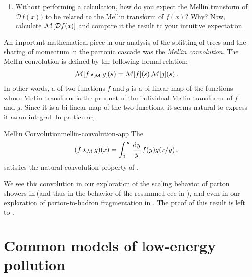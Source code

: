 \begin{subappendices}
\begin{exercise}
\begin{enumerate}[label=\roman*)]
        \item
            Without performing a calculation, how do you expect the Mellin transform of \(\mathcal{D} f(x))\) to be related to the Mellin transform of \(f(x)\)?
            Why?
            Now, calculate \(\mathcal{M}\left[\mathcal{D} f(x)\right]\) and compare it the result to your intuitive expectation.
    \end{enumerate}
\end{exercise}



An important mathematical piece in our analysis of the splitting of trees and the sharing of momentum in the partonic cascade was the \textit{Mellin convolution}.
%
The Mellin convolution is defined by the following formal relation:
\begin{align}
    \label{eq:convolution-property}
    \mathcal{M}[f \mellinconvolution g](s)
    =
    \mathcal{M}[f](s) \, \mathcal{M}[g](s)
    \,.
\end{align}
In other words, a  of two functions \(f\) and \(g\) is a bi-linear map of the functions whose Mellin transform is the product of the individual Mellin transforms of \(f\) and \(g\).
%
Since it is a bi-linear map of the two functions, it seems natural to express it as an integral.
%
In particular,
\begin{proposition}{Mellin Convolution}{mellin-convolution-app}
    The 
    \begin{align}
        (f \star_{\mathcal M} g)(x)
        =
        \int_0^\infty \frac{\dd y}{y}\, f(y) g(x/y)
        \,,
    \end{align}
    satisfies the natural convolution property of .
\end{proposition}
%
We see this convolution in our exploration of the scaling behavior of parton showers in  (and thus in the behavior of the resummed \gls{eec} in ), and even in our exploration of parton-to-hadron fragmentation in .
%
The proof of this result is left to .




\section{Common models of low-energy pollution}
\label{app:pollution-models}


\end{subappendices}
